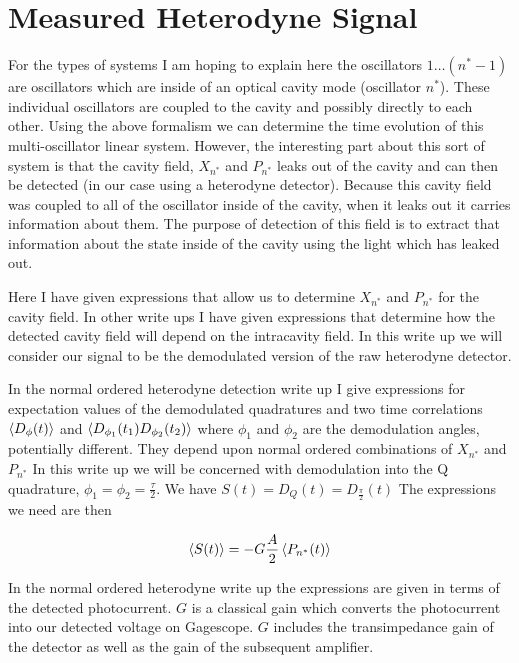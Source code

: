 \documentclass[12pt]{article}
\begin{document}
\section{Measured Heterodyne Signal}
For the types of systems I am hoping to explain here the oscillators $1\ldots (n^*-1)$ are oscillators which are inside of an optical cavity mode (oscillator $n^*$). These individual oscillators are coupled to the cavity and possibly directly to each other. Using the above formalism we can determine the time evolution of this multi-oscillator linear system. However, the interesting part about this sort of system is that the cavity field, $X_{n^*}$ and $P_{n^*}$ leaks out of the cavity and can then be detected (in our case using a heterodyne detector). Because this cavity field was coupled to all of the oscillator inside of the cavity, when it leaks out it carries information about them. The purpose of detection of this field is to extract that information about the state inside of the cavity using the light which has leaked out.

Here I have given expressions that allow us to determine $X_{n^*}$ and $P_{n^*}$ for the cavity field. In other write ups I have given expressions that determine how the detected cavity field will depend on the intracavity field. In this write up we will consider our signal to be the demodulated version of the raw heterodyne detector. 

In the normal ordered heterodyne detection write up I give expressions for expectation values of the demodulated quadratures and two time correlations $\Braket{D_{\phi}(t)}$ and $\Braket{D_{\phi_1}(t_1)D_{\phi_2}(t_2)}$ where $\phi_1$ and $\phi_2$ are the demodulation angles, potentially different. They depend upon normal ordered combinations of $X_{n^*}$ and $P_{n^*}$ In this write up we will be concerned with demodulation into the Q quadrature, $\phi_1=\phi_2 = \frac{\tau}{2}$. We have $S(t) = D_Q(t) = D_{\frac{\pi}{2}}(t)$ The expressions we need are then

\begin{align}
\Braket{S(t)} = -G\frac{A}{2}\Braket{P_{n^*}(t)}
\end{align}

In the normal ordered heterodyne write up the expressions are given in terms of the detected photocurrent. $G$ is a classical gain which converts the photocurrent into our detected voltage on Gagescope. $G$ includes the transimpedance gain of the detector as well as the gain of the subsequent amplifier.
\end{document}
